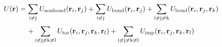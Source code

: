 \documentclass[12pt]{article}
\begin{document}
\begin{displaymath}
U({\bf r}) =
{
{
\sum_{\rm i \neq j} U_{\rm nonbond}({\bf r}_{i},{\bf r}_{j})
+
\sum_{\rm i \neq j} U_{\rm bond}({\bf r}_{i},{\bf r}_{j})
+
\sum_{\rm i \neq j \neq k} U_{\rm bend}({\bf r}_{i},{\bf r}_{j},{\bf r}_{k})\\
}
}
\end{displaymath}
\begin{displaymath}
{
{
+
\sum_{\rm i \neq j \neq k \neq l} U_{\rm tor}({\bf r}_{i},{\bf r}_{j},{\bf r}_{k},{\bf r}_{l})
+
\sum_{\rm i \neq j \neq k \neq l} U_{\rm imp}({\bf r}_{i},{\bf r}_{j},{\bf r}_{k},{\bf r}_{l})
}
}
\end{displaymath}
\end{document}
